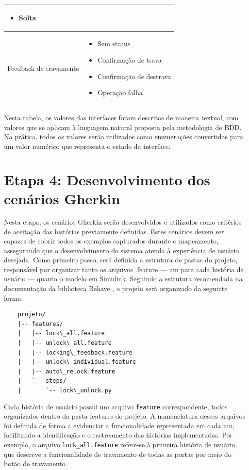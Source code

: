 \begin{quadro}[h]
\begin{tabular}{|p{5cm}|p{7cm}|}
\begin{itemize}[topsep=0pt, partopsep=0pt, leftmargin=*]
    \item Solta
\end{itemize} \\
\hline
Feedback de travamento &
\begin{itemize}[topsep=0pt, partopsep=0pt, leftmargin=*]
    \item Sem status
    \item Confirmação de trava
    \item Confirmação de destrava
    \item Operação falha
\end{itemize} \\
\hline
\end{tabular}
\end{quadro}

Nesta tabela, os valores das interfaces foram descritos de maneira textual, com valores que se aplicam à linguagem natural proposta pela metodologia de BDD. 
Na prática, todos os valores serão utilizados como enumerações convertidas para um valor numérico que representa o estado da interface.

\section{Etapa 4: Desenvolvimento dos cenários Gherkin}

Nesta etapa, os cenários Gherkin serão desenvolvidos e utilizados como critérios de aceitação das histórias previamente definidas. Estes cenários devem ser capazes 
de cobrir todos os exemplos capturados durante o mapeamento, assegurando que o desenvolvimento do sistema atenda à experiência de usuário desejada.
Como primeiro passo, será definida a estrutura de pastas do projeto, responsável por organizar tanto os arquivos .feature — um para cada história de usuário — 
quanto o modelo em Simulink. Seguindo a estrutura recomendada na documentação da biblioteca Behave \cite{behaveDocs}, o projeto será organizado da seguinte forma:

\begin{verbatim}
    projeto/
    |-- features/
    |   |-- lock\_all.feature
    |   |-- unlock\_all.feature
    |   |-- locking\_feedback.feature
    |   |-- unlock\_individual.feature
    |   |-- auto\_relock.feature
    |   `-- steps/
    |       `-- lock\_unlock.py
\end{verbatim}

Cada história de usuário possui um arquivo \texttt{\.feature} correspondente, todos organizados dentro da pasta features do projeto. A nomenclatura desses 
arquivos foi definida de forma a evidenciar a funcionalidade representada em cada um, facilitando a identificação e o rastreamento das histórias implementadas. 
Por exemplo, o arquivo \texttt{lock\_all.feature} refere-se à primeira história de usuário, que descreve a funcionalidade de travamento de todas as portas 
por meio do botão de travamento.

